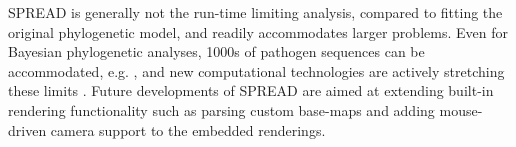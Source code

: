 SPREAD is generally not the run-time limiting analysis, compared to fitting the original phylogenetic model, and readily accommodates larger problems.
Even for Bayesian phylogenetic analyses, 1000s of pathogen sequences can be accommodated, e.g. \cite{Rambaut2008}, and new computational technologies are actively stretching these limits \citep{Suchard2009}.
Future developments of SPREAD are aimed at extending built-in rendering functionality such as parsing custom base-maps and adding mouse-driven camera support to the embedded renderings. 
